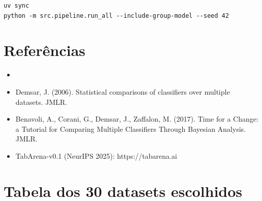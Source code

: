 \documentclass[11pt,a4paper]{article}
\begin{document}

\begin{verbatim}
uv sync
python -m src.pipeline.run_all --include-group-model --seed 42
\end{verbatim}

\section*{Referências}

\begin{itemize}[leftmargin=1.2em]
\item [paper original do modelo]
\item Demsar, J. (2006). Statistical comparisons of classifiers over multiple datasets. JMLR.
\item Benavoli, A., Corani, G., Demsar, J., Zaffalon, M. (2017). Time for a Change: a Tutorial for Comparing Multiple Classifiers Through Bayesian Analysis. JMLR.
\item TabArena-v0.1 (NeurIPS 2025): https://tabarena.ai
\end{itemize}

\appendix

\section{Tabela dos 30 datasets escolhidos}

\end{document}
